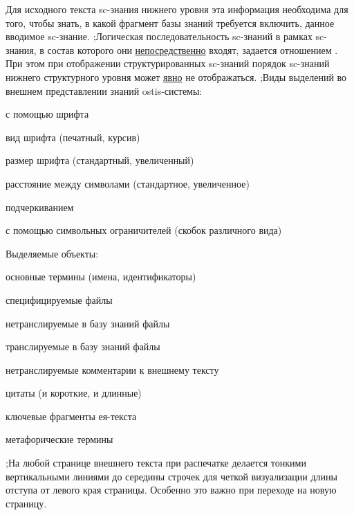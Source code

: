 \begin{SCn}
{Для исходного текста sc-знания нижнего уровня эта информация необходима для того, чтобы знать, в какой фрагмент базы знаний требуется включить,  данное вводимое sc-знание.
;Логическая последовательность sc-знаний в рамках sc-знания, в состав которого они \uline{непосредственно} входят, задается отношением .\\
При этом при отображении структурированных sc-знаний порядок sc-знаний нижнего структурного уровня может \uline{явно} не отображаться.
;Виды выделений во внешнем представлении знаний ostis-системы:
\begin{scnitemize}
    \item с помощью шрифта
    \begin{scnitemizeii}
        \item вид шрифта (печатный, курсив)
        \item размер шрифта (стандартный, увеличенный)
        \item расстояние между символами (стандартное, увеличенное)
    \end{scnitemizeii}
    \item подчеркиванием
    \item с помощью символьных ограничителей (скобок различного вида)
\end{scnitemize}
Выделяемые объекты:
\begin{scnitemize}
    \item основные термины (имена, идентификаторы)
    \item специфицируемые файлы
    \begin{scnitemizeii}
        \item нетранслируемые в базу знаний файлы
        \item транслируемые в базу знаний файлы
    \end{scnitemizeii}
    \item нетранслируемые комментарии к внешнему тексту
    \item цитаты (и короткие, и длинные)
    \item ключевые фрагменты ея-текста
    \item метафорические термины
\end{scnitemize}
;На любой странице внешнего текста при распечатке делается  тонкими вертикальными линиями до середины строчек для четкой визуализации длины отступа от левого края страницы. Особенно это важно при переходе на новую страницу.}  
\filemodefalse


\end{SCn}
